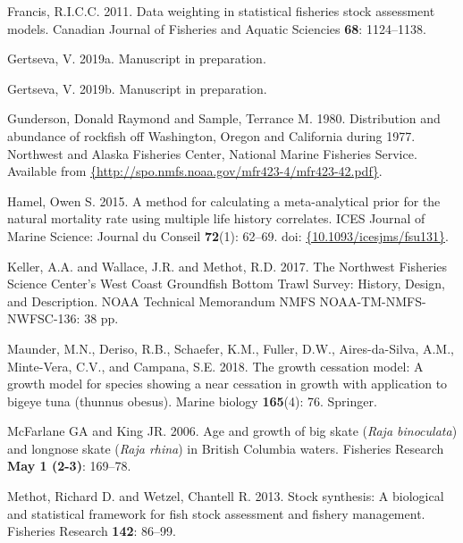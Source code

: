\documentclass[12pt,]{article}
\begin{document}
\leavevmode\hypertarget{ref-Francis2011}{}%
Francis, R.I.C.C. 2011. Data weighting in statistical fisheries stock
assessment models. Canadian Journal of Fisheries and Aquatic Sciencies
\textbf{68}: 1124--1138.

\leavevmode\hypertarget{ref-Gertseva2019}{}%
Gertseva, V. 2019a. Manuscript in preparation.

\leavevmode\hypertarget{ref-Gertseva2011}{}%
Gertseva, V. 2019b. Manuscript in preparation.

\leavevmode\hypertarget{ref-Gunderson1980}{}%
Gunderson, Donald Raymond and Sample, Terrance M. 1980. Distribution and
abundance of rockfish off Washington, Oregon and California during 1977.
Northwest and Alaska Fisheries Center, National Marine Fisheries
Service. Available from
\href{\%7Bhttp://spo.nmfs.noaa.gov/mfr423-4/mfr423-42.pdf\%7D}{\{http://spo.nmfs.noaa.gov/mfr423-4/mfr423-42.pdf\}}.

\leavevmode\hypertarget{ref-Hamel2015}{}%
Hamel, Owen S. 2015. A method for calculating a meta-analytical prior
for the natural mortality rate using multiple life history correlates.
ICES Journal of Marine Science: Journal du Conseil \textbf{72}(1):
62--69. doi:
\href{https://doi.org/\%7B10.1093/icesjms/fsu131\%7D}{\{10.1093/icesjms/fsu131\}}.

\leavevmode\hypertarget{ref-Keller2017}{}%
Keller, A.A. and Wallace, J.R. and Methot, R.D. 2017. The Northwest
Fisheries Science Center's West Coast Groundfish Bottom Trawl Survey:
History, Design, and Description. NOAA Technical Memorandum NMFS
NOAA-TM-NMFS-NWFSC-136: 38 pp.

\leavevmode\hypertarget{ref-maunder2018growth}{}%
Maunder, M.N., Deriso, R.B., Schaefer, K.M., Fuller, D.W.,
Aires-da-Silva, A.M., Minte-Vera, C.V., and Campana, S.E. 2018. The
growth cessation model: A growth model for species showing a near
cessation in growth with application to bigeye tuna (thunnus obesus).
Marine biology \textbf{165}(4): 76. Springer.

\leavevmode\hypertarget{ref-McFandKing2006}{}%
McFarlane GA and King JR. 2006. Age and growth of big skate (\emph{Raja
binoculata}) and longnose skate (\emph{Raja rhina}) in British Columbia
waters. Fisheries Research \textbf{May 1 (2-3)}: 169--78.

\leavevmode\hypertarget{ref-Methot2013}{}%
Methot, Richard D. and Wetzel, Chantell R. 2013. Stock synthesis: A
biological and statistical framework for fish stock assessment and
fishery management. Fisheries Research \textbf{142}: 86--99.
\end{document}
